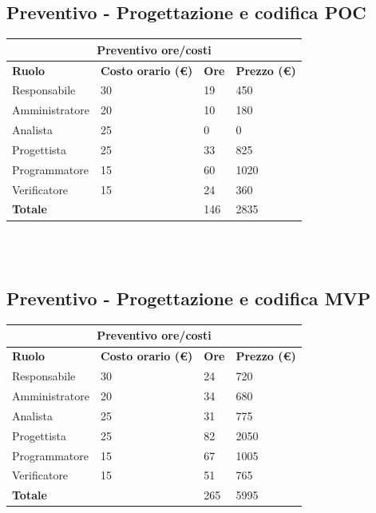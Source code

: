 \documentclass[9pt]{article}
\begin{document}
\subsection{Preventivo - Progettazione e codifica POC}

\begin{center}
	\begin{tabularx}{\textwidth}{|X|X|X|X|}										
		\hline									
		\multicolumn{4}{|c|}{\textbf{Preventivo ore/costi}}                                      \\									
		\hline									
		\hline									
		\textbf{Ruolo}  & \textbf{Costo orario (\euro)} & \textbf{Ore} & \textbf{Prezzo (\euro)} \\									
		\hline									
		Responsabile    &	30		&	19		&	450		\\
		\hline									
		Amministratore  &	20		&	10		&	180		\\
		\hline									
		Analista        &	25		&	0		&	0		\\
		\hline									
		Progettista     &	25		&	33		&	825		\\
		\hline									
		Programmatore   &	15		&	60		&	1020		\\
		\hline									
		Verificatore    &	15		&	24		&	360		\\
		\hline									
		\textbf{Totale} &			&	146		&	2835		\\
		\hline																	
	\end{tabularx}\\[8pt]										
	\mbox{}\\
\end{center}

\subsection{Preventivo - Progettazione e codifica MVP}
\begin{center}
	\begin{tabularx}{\textwidth}{|X|X|X|X|}										
		\hline									
		\multicolumn{4}{|c|}{\textbf{Preventivo ore/costi}}                                      \\									
		\hline									
		\hline									
		\textbf{Ruolo}  & \textbf{Costo orario (\euro)} & \textbf{Ore} & \textbf{Prezzo (\euro)} \\									
		\hline									
		Responsabile    &	30		&	24		&	720		\\
		\hline									
		Amministratore  &	20		&	34		&	680		\\
		\hline									
		Analista        &	25		&	31		&	775		\\
		\hline									
		Progettista     &	25		&	82		&	2050		\\
		\hline									
		Programmatore   &	15		&	67		&	1005		\\
		\hline									
		Verificatore    &	15		&	51		&	765		\\
		\hline									
		\textbf{Totale} &			&	265		&	5995		\\
		\hline
	\end{tabularx}\\[8pt]
	\mbox{}\\
\end{center}
\end{document}
